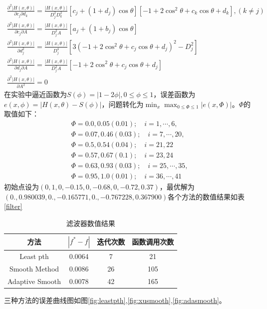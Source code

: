 \documentclass{ctexart}
\begin{document}
\begin{align}
	\frac{\partial^2{|H(x,\theta)|}}{\partial{c_j}\partial{d_k}}=\frac{|H(x,\theta)|}{D_j^2D_k^2}[c_j+(1+d_j)\cos\theta][-1+2\cos^2\theta+c_k\cos\theta+d_k],(k\neq j)\\
	\frac{\partial^2{|H(x,\theta)|}}{\partial{c_j}\partial{A}}=\frac{|H(x,\theta)|}{D_j^2A}[a_j+(1+b_j)\cos\theta]\\
	\frac{\partial^2{|H(x,\theta)|}}{\partial{d_j^2}}=\frac{|H(x,\theta)|}{D_j^4}[3(-1+2\cos^2\theta+c_j\cos\theta+d_j)^2-D_j^2]\\
	\frac{\partial^2{|H(x,\theta)|}}{\partial{d_j}\partial{A}}=\frac{|H(x,\theta)|}{D_j^2A}[-1+2\cos^2\theta+c_j\cos\theta+d_j]\\	
	\frac{\partial^2{|H(x,\theta)|}}{\partial A^2}=0
\end{align}
在实验中逼近函数为$S(\phi) = |1-2\phi|,0\leq\phi\leq 1$，误差函数为$e(x,\phi)=|H(x,\theta)-S(\phi)|$，问题转化为$\min_x\max_{0\leq\Phi\leq 1}{|e(x,\Phi)|}$。$\Phi$的取值如下：
\begin{align}
	\Phi = 0.0, 0.05(0.01);\quad i=1,\cdots,6,\\
	\Phi = 0.07, 0.46(0.03);\quad i=7,\cdots,20,\\
	\Phi = 0.5, 0.54(0.04);\quad i=21,22\\
	\Phi = 0.57,0.67(0.1);\quad i=23,24\\
	\Phi = 0.63,0.93(0.03);\quad i=25,\cdots,35,\\
	\Phi = 0.95,1.0(0.01);\quad i=36,\cdots,41
\end{align}
初始点设为$(0,1,0,-0.15,0,-0.68,0,-0.72,0.37)$，最优解为$(0.,0.980039,0.,-0.165771,0.,-0.767228,0.367900)$各个方法的数值结果如表\ref{filter}
\begin{table}[htpb]
	\centering
	\caption{滤波器数值结果}
	\label{tab:rspro}
	\begin{tabular}{c c c c}
	\hline
	方法 & $|f^*-f|$ & 迭代次数 & 函数调用次数 \\\hline
	Least pth & 0.0064 & 7 &21 \\
	Smooth Method & 0.0086 & 26 & 105\\
	Adaptive Smooth &0.0078 &42 & 165 \\
	\hline
	\end{tabular}
\end{table}
三种方法的误差曲线图如图\ref{fig:leastpth},\ref{fig:xusmooth},\ref{fig:adasmooth}。
\end{document}
